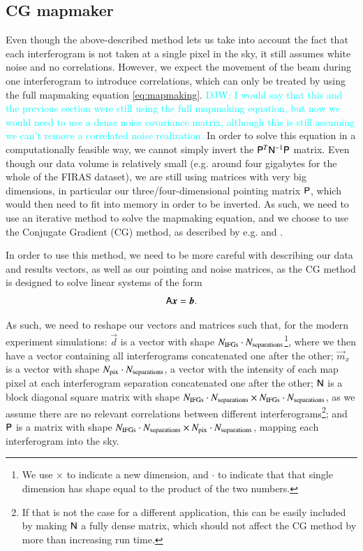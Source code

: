 \documentclass{aa}
\renewcommand{\P}[0]{\tens{P}}
\newcommand{\dv}[0]{\vec{d}}
\newcommand{\A}[0]{\tens{A}}
\newcommand{\m}[0]{\vec{m}}
\newcommand{\N}[0]{\tens{N}}
\newcommand{\iN}[0]{\tens{N}^{-1}}
\newcommand{\matP}[0]{\tens{P}}
\newcommand{\x}{\vec{x}}
\renewcommand{\b}{\vec{b}}
\newcommand{\djw}[1]{\textcolor{cyan}{{DJW:} #1}}
\begin{document}
\subsection{CG mapmaker}
\label{sec:cg-mapmaker}

Even though the above-described method lets us take into account the fact that each interferogram is not taken at a single pixel in the sky, it still assumes white noise and no correlations. However, we expect the movement of the beam during one interferogram to introduce correlations, which can only be treated by using the full mapmaking equation \eqref{eq:mapmaking}. \djw{I would say that this and the previous section were still using the full mapmaking equation, but now we would need to use a dense noise covariance matrix, although this is still assuming we can't remove a correlated noise realization.} In order to solve this equation in a computationally feasible way, we cannot simply invert the $\matP^T\iN \matP$ matrix. Even though our data volume is relatively small (e.g. around four gigabytes for the whole of the FIRAS dataset), we are still using matrices with very big dimensions, in particular our three/four-dimensional pointing matrix $\P$, which would then need to fit into memory in order to be inverted. As such, we need to use an iterative method to solve the mapmaking equation, and we choose to use the Conjugate Gradient (CG) method, as described by e.g. \citet{hestenes1952} and \citet{shewchuk:1994}.

In order to use this method, we need to be more careful with describing our data and results vectors, as well as our pointing and noise matrices, as the CG method is designed to solve linear systems of the form
\begin{equation}
    \A \x = \b.
\end{equation}

As such, we need to reshape our vectors and matrices such that, for the modern experiment simulations: $\dv$ is a vector with shape $N_{\rm IFGs} \cdot N_{\rm separations}$\footnote{We use $\times$ to indicate a new dimension, and $\cdot$ to indicate that that single dimension has shape equal to the product of the two numbers.}, where we then have a vector containing all interferograms concatenated one after the other; $\m_x$ is a vector with shape $N_{\rm pix} \cdot N_{\rm separations}$, a vector with the intensity of each map pixel at each interferogram separation concatenated one after the other; $\N$ is a block diagonal square matrix with shape $N_{\rm IFGs} \cdot N_{\rm separations} \times N_{\rm IFGs} \cdot N_{\rm separations}$, as we assume there are no relevant correlations between different interferograms\footnote{If that is not the case for a different application, this can be easily included by making $\N$ a fully dense matrix, which should not affect the CG method by more than increasing run time.}; and $\matP$ is a matrix with shape $N_{\rm IFGs} \cdot N_{\rm separations} \times N_{\rm pix} \cdot N_{\rm separations}$, mapping each interferogram into the sky.
\end{document}
